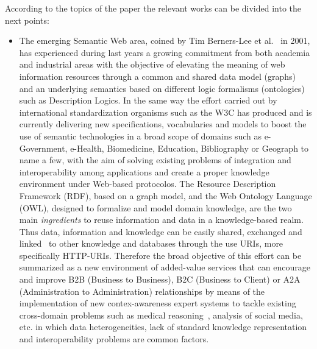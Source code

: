 According to the topics of the paper the relevant works can be divided into the next points:

\begin{itemize}
 \item  The emerging Semantic Web area, coined by Tim Berners-Lee et al.~\cite{Berners-Lee2001} in 2001, 
 has experienced during last years a growing commitment from both academia and industrial areas 
 with the objective of elevating the meaning of web information resources through a common and shared data model (graphs) and 
 an underlying semantics based on different logic formalisms (ontologies) such as Description Logics. 
 In the same way the effort carried out by international standardization organisms such as the W3C has produced and is currently delivering 
 new specifications, vocabularies and models to boost the use of semantic technologies in a broad scope 
 of domains such as e-Government, e-Health, Biomedicine, Education, Bibliography or Geograph to name a few, 
 with the aim of solving existing problems of integration and interoperability among applications and create 
 a proper knowledge environment under Web-based protocolos. The Resource Description Framework (RDF), based on a graph model, 
 and the Web Ontology Language (OWL), designed to formalize and model domain knowledge, 
 are the two main \textit{ingredients} to reuse information and data in a knowledge-based realm. Thus data, information 
 and knowledge can be easily shared, exchanged and linked~\cite{Maali_Cyganiak_2011} to other knowledge and databases 
 through the use URIs, more specifically HTTP-URIs. Therefore the broad objective of this effort can be summarized 
 as a new environment of added-value services that can encourage and improve B2B (Business to Business), B2C (Business to Client) or 
 A2A (Administration to Administration) relationships by means of the implementation of new contex-awareness expert systems to tackle existing 
 cross-domain problems such as medical reasoning~\cite{DBLP:journals/cbm/GonzalezA13,DBLP:journals/eswa/Casado-LumbrerasGAP12}, 
 analysis of social media, etc. in which data heterogeneities, lack of standard knowledge representation 
 and interoperability problems are common factors. 
 

\end{itemize}
